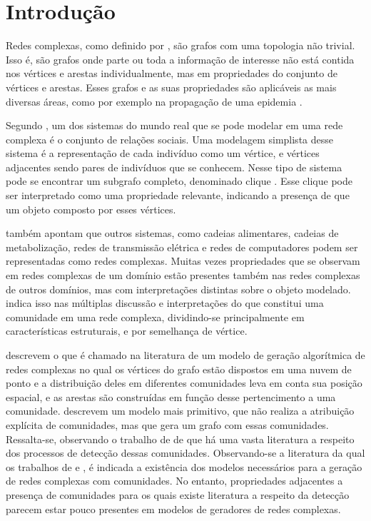 \documentclass[notes.tex]{subfiles}
\begin{document}
\chapter{Introdução}

Redes complexas, como definido por , são grafos com uma topologia não trivial.
Isso é, são grafos onde parte ou toda a informação de interesse não está contida nos vértices e arestas individualmente, mas em propriedades do conjunto de vértices e arestas.
Esses grafos e as suas propriedades são aplicáveis as mais diversas áreas, como por exemplo na propagação de uma epidemia \cite{stegehuis2016epidemic}.

Segundo , um dos sistemas do mundo real que se pode modelar em uma rede complexa é o conjunto de relações sociais.
Uma modelagem simplista desse sistema é a representação de cada indivíduo como um vértice, e vértices adjacentes sendo pares de indivíduos que se conhecem.
Nesse tipo de sistema pode se encontrar um subgrafo completo, denominado clique \cite{fortunato2010community}.
Esse clique pode ser interpretado como uma propriedade relevante, indicando a presença de que um objeto composto por esses vértices.

 também apontam que outros sistemas, como cadeias alimentares, cadeias de metabolização, redes de transmissão elétrica e redes de computadores podem ser representadas como redes complexas.
Muitas vezes propriedades que se observam em redes complexas de um domínio estão presentes também nas redes complexas de outros domínios, mas com interpretações distintas sobre o objeto modelado.
 indica isso nas múltiplas discussão e interpretações do que constitui uma comunidade em uma rede complexa, dividindo-se principalmente em características estruturais, e por semelhança de vértice.
 
 descrevem o que é chamado na literatura de um modelo de geração algorítmica de redes complexas no qual os vértices do grafo estão dispostos em uma nuvem de ponto e a distribuição deles em diferentes comunidades leva em conta sua posição espacial, e as arestas são construídas em função desse pertencimento a uma comunidade.
 descrevem um modelo mais primitivo, que não realiza a atribuição explícita de comunidades, mas que gera um grafo com essas comunidades. 
Ressalta-se, observando o trabalho de  de que há uma vasta literatura a respeito dos processos de detecção dessas comunidades.
Observando-se a literatura da qual os trabalhos de  e , é indicada a existência dos modelos necessários para a geração de redes complexas com comunidades.
No entanto, propriedades adjacentes a presença de comunidades para os quais existe literatura a respeito da detecção parecem estar pouco presentes em modelos de geradores de redes complexas.
\end{document}

